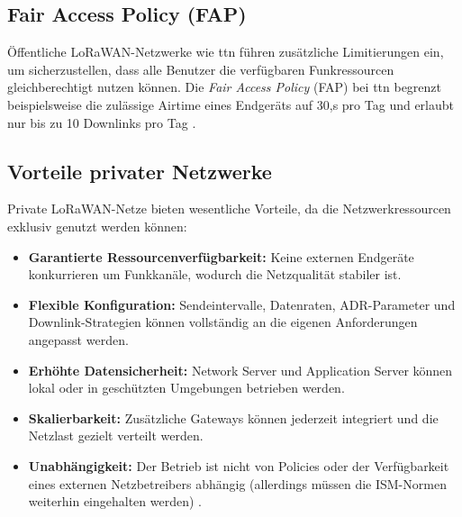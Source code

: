 \subsection{Fair Access Policy (FAP)}

Öffentliche LoRaWAN-Netzwerke wie \ac{ttn} führen zusätzliche Limitierungen ein, um sicherzustellen, dass alle Benutzer die verfügbaren Funkressourcen gleichberechtigt nutzen können. Die \emph{Fair Access Policy} (FAP) bei \ac{ttn} begrenzt beispielsweise die zulässige Airtime eines Endgeräts auf 30,s pro Tag und erlaubt nur bis zu 10 Downlinks pro Tag \cite{TTN:2021b}.

\subsection{Vorteile privater Netzwerke}

Private LoRaWAN-Netze bieten wesentliche Vorteile, da die Netzwerkressourcen exklusiv genutzt werden können:

\begin{itemize}
	\item \textbf{Garantierte Ressourcenverfügbarkeit:} Keine externen Endgeräte konkurrieren um Funkkanäle, wodurch die Netzqualität stabiler ist.
	\item \textbf{Flexible Konfiguration:} Sendeintervalle, Datenraten, ADR-Parameter und Downlink-Strategien können vollständig an die eigenen Anforderungen angepasst werden.
	\item \textbf{Erhöhte Datensicherheit:} Network Server und Application Server können lokal oder in geschützten Umgebungen betrieben werden.
	\item \textbf{Skalierbarkeit:} Zusätzliche Gateways können jederzeit integriert und die Netzlast gezielt verteilt werden.
	\item \textbf{Unabhängigkeit:} Der Betrieb ist nicht von Policies oder der Verfügbarkeit eines externen Netzbetreibers abhängig (allerdings müssen die ISM-Normen weiterhin eingehalten werden) \cite{Montagny:2022}.
\end{itemize}



